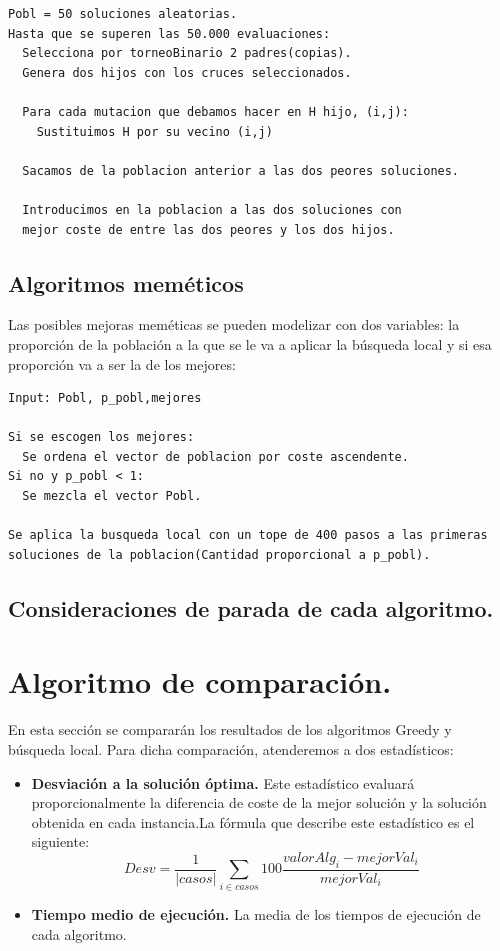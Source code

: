 \begin{lstlisting}
Pobl = 50 soluciones aleatorias.
Hasta que se superen las 50.000 evaluaciones:
  Selecciona por torneoBinario 2 padres(copias).
  Genera dos hijos con los cruces seleccionados.

  Para cada mutacion que debamos hacer en H hijo, (i,j):
    Sustituimos H por su vecino (i,j)

  Sacamos de la poblacion anterior a las dos peores soluciones.

  Introducimos en la poblacion a las dos soluciones con
  mejor coste de entre las dos peores y los dos hijos.
\end{lstlisting}

\subsection{Algoritmos meméticos}

Las posibles mejoras meméticas se pueden modelizar con dos variables: la proporción de la población a la que se le va a aplicar la búsqueda local y si esa proporción va a ser la de los mejores:

\begin{lstlisting}
Input: Pobl, p_pobl,mejores

Si se escogen los mejores:
  Se ordena el vector de poblacion por coste ascendente.
Si no y p_pobl < 1:
  Se mezcla el vector Pobl.

Se aplica la busqueda local con un tope de 400 pasos a las primeras
soluciones de la poblacion(Cantidad proporcional a p_pobl).
\end{lstlisting}

\newpage

\subsection{Consideraciones de parada de cada algoritmo.}



\newpage

\section{Algoritmo de comparación.}
En esta sección se compararán los resultados de los algoritmos Greedy y búsqueda local. Para dicha comparación, atenderemos a dos estadísticos:\\

\begin{itemize}
	\item \textbf{Desviación a la solución óptima.} Este estadístico evaluará proporcionalmente la diferencia de coste de la mejor solución y la solución obtenida en cada instancia.La fórmula que describe este estadístico es el siguiente:
	\[Desv = \dfrac{1}{ \left| casos\right|}\sum_{i \in casos}100\dfrac{valorAlg_i - mejorVal_i}{mejorVal_i} \]
	
	\item \textbf{Tiempo medio de ejecución.} La media de los tiempos de ejecución de cada algoritmo.
\end{itemize}

